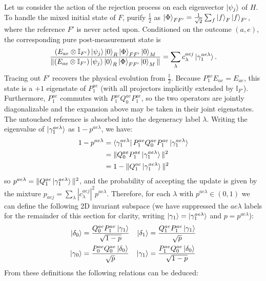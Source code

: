 \documentclass[aps,floatfix,10pt,amssymb,amsfont,amsmath,superscriptaddress,float,nofootinbib,longbibliography,nobalancelastpage,twocolumn]{revtex4-2}
\begin{document}
Let us consider the action of the rejection process on each eigenvector $\ket{\psi_j}$ of $H$. To handle the mixed initial state of $F$, purify $\frac{\mathbb{I}}{2}$ as $\ket{\Phi}_{FF'}=\frac{1}{\sqrt{2}}\sum_f\ket{f}_F\ket{f}_{F'}$, where the reference $F'$ is never acted upon. Conditioned on the outcome $(a,e)$, the corresponding pure post-measurement state is
\begin{equation}
    \frac{(E_{ae}\otimes\mathbb I_{F'})\ket{\psi_j}\ket{0}_R\ket{\Phi}_{FF'}\ket{0}_M}
    {\|(E_{ae}\otimes\mathbb I_{F'})\ket{\psi_j}\ket{0}_R\ket{\Phi}_{FF'}\ket{0}_M\|}
    = \sum_{\lambda} c_{\lambda}^{aej}\ket{\gamma_1^{ae \lambda}}.
\end{equation}
Tracing out $F'$ recovers the physical evolution from $\frac{\mathbb{I}}{2}$. Because $P_1^{ae}E_{ae}=E_{ae}$, this state is a $+1$ eigenstate of $P_1^{ae}$ (with all projectors implicitly extended by $\mathbb I_{F'}$). Furthermore, $P_1^{ae}$ commutes with $P^{ae}_1Q^{ae}_0P^{ae}_1$, so the two operators are jointly diagonalizable and the expansion above may be taken in their joint eigenstates. The untouched reference is absorbed into the degeneracy label $\lambda$.
Writing the eigenvalue of $\ket{\gamma^{ae\lambda}_1}$ as $1-p^{ae\lambda}$, we have: \begin{align}1-p^{ae\lambda}&=\bra{\gamma^{ae\lambda}_1}P^{ae}_1Q^{ae}_0P^{ae}_1\ket{\gamma^{ae\lambda}_1} \\&=\|Q^{ae}_0P^{ae}_1\ket{\gamma^{ae\lambda}_1}\|^2\\ &= 1-\|Q^{ae}_1\ket{\gamma^{ae\lambda}_1}\|^2
\end{align}
so $p^{ae\lambda} = \|Q^{ae}_1\ket{\gamma^{ae\lambda}_1}\|^2$, and the probability of accepting the update is given by the mixture $p_{aej} = \sum_{\lambda}|c^{aej}_{\lambda}|^2p^{ae\lambda}$. Therefore, for each $\lambda$ with $p^{ae\lambda} \in (0,1)$ we can define the following 2D invariant subspace (we have suppressed the $ae\lambda$ labels for the remainder of this section for clarity, writing $\ket{\gamma_1} = \ket{\gamma^{ae\lambda}_1}$ and $p = p^{ae\lambda}$):
\begin{align}
    \ket{\delta_0} &= \frac{Q^{ae}_0P^{ae}_1\ket{\gamma_1}}{\sqrt{1-p}} &\ket{\delta_1} &= \frac{Q^{ae}_1P^{ae}_1\ket{\gamma_1}}{\sqrt{p}} \\
    \ket{\gamma_0} &= \frac{P^{ae}_0Q^{ae}_0\ket{\delta_0}}{\sqrt{p}} &\ket{\gamma_1} &= \frac{P^{ae}_1Q^{ae}_0\ket{\delta_0}}{\sqrt{1-p}}
\end{align}
From these definitions the following relations can be deduced:
\end{document}
